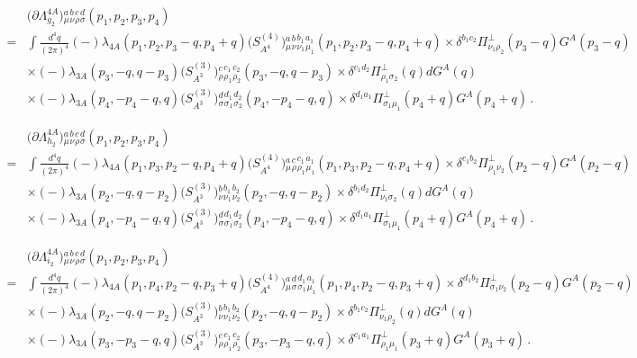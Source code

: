 \begin{align}
  &\big(\partial\Lambda^{4A}_{g_2}\big){}^{a}_{\mu}{}^{b}_{\nu}{}^{c}_{\rho}{}^{d}_{\sigma}(p_1,p_2,p_3,p_4)\nonumber \\[2ex]
 =&\int \frac{d^4 q}{(2\pi)^4} (-)\lambda_{4A}(p_1,p_2,p_3-q,p_4+q)\big(S^{(4)}_{A^4}\big){}^{a}_{\mu}{}^{b}_{\nu}{}^{b_1}_{\nu_1}{}^{a_1}_{\mu_1}(p_1,p_2,p_3-q,p_4+q)\times\delta^{b_1c_2}\Pi_{\nu_1\rho_2}^{\perp}(p_3-q)G^A(p_3-q)\nonumber \\[2ex]
 &\times(-)\lambda_{3A}(p_3,-q,q-p_3)\big(S^{(3)}_{A^3}\big){}^{c}_{\rho}{}^{c_1}_{\rho_1}{}^{c_2}_{\rho_2}(p_3,-q,q-p_3)\times\delta^{c_1d_2}\Pi_{\rho_1\sigma_2}^{\perp}(q)dG^A(q)\nonumber \\[2ex]
 &\times(-)\lambda_{3A}(p_4,-p_4-q,q)\big(S^{(3)}_{A^3}\big){}^{d}_{\sigma}{}^{d_1}_{\sigma_1}{}^{d_2}_{\sigma_2}(p_4,-p_4-q,q)\times\delta^{d_1a_1}\Pi_{\sigma_1\mu_1}^{\perp}(p_4+q)G^A(p_4+q)\,.
\end{align}

\begin{align}
  &\big(\partial\Lambda^{4A}_{h_2}\big){}^{a}_{\mu}{}^{b}_{\nu}{}^{c}_{\rho}{}^{d}_{\sigma}(p_1,p_2,p_3,p_4)\nonumber \\[2ex]
 =&\int \frac{d^4 q}{(2\pi)^4} (-)\lambda_{4A}(p_1,p_3,p_2-q,p_4+q)\big(S^{(4)}_{A^4}\big){}^{a}_{\mu}{}^{c}_{\rho}{}^{c_1}_{\rho_1}{}^{a_1}_{\mu_1}(p_1,p_3,p_2-q,p_4+q)\times\delta^{c_1b_2}\Pi_{\rho_1\nu_2}^{\perp}(p_2-q)G^A(p_2-q)\nonumber \\[2ex]
 &\times(-)\lambda_{3A}(p_2,-q,q-p_2)\big(S^{(3)}_{A^3}\big){}^{b}_{\nu}{}^{b_1}_{\nu_1}{}^{b_2}_{\nu_2}(p_2,-q,q-p_2)\times\delta^{b_1d_2}\Pi_{\nu_1\sigma_2}^{\perp}(q)dG^A(q)\nonumber \\[2ex]
 &\times(-)\lambda_{3A}(p_4,-p_4-q,q)\big(S^{(3)}_{A^3}\big){}^{d}_{\sigma}{}^{d_1}_{\sigma_1}{}^{d_2}_{\sigma_2}(p_4,-p_4-q,q)\times\delta^{d_1a_1}\Pi_{\sigma_1\mu_1}^{\perp}(p_4+q)G^A(p_4+q)\,.
\end{align}

\begin{align}
  &\big(\partial\Lambda^{4A}_{i_2}\big){}^{a}_{\mu}{}^{b}_{\nu}{}^{c}_{\rho}{}^{d}_{\sigma}(p_1,p_2,p_3,p_4)\nonumber \\[2ex]
 =&\int \frac{d^4 q}{(2\pi)^4} (-)\lambda_{4A}(p_1,p_4,p_2-q,p_3+q)\big(S^{(4)}_{A^4}\big){}^{a}_{\mu}{}^{d}_{\sigma}{}^{d_1}_{\sigma_1}{}^{a_1}_{\mu_1}(p_1,p_4,p_2-q,p_3+q)\times\delta^{d_1b_2}\Pi_{\sigma_1\nu_2}^{\perp}(p_2-q)G^A(p_2-q)\nonumber \\[2ex]
 &\times(-)\lambda_{3A}(p_2,-q,q-p_2)\big(S^{(3)}_{A^3}\big){}^{b}_{\nu}{}^{b_1}_{\nu_1}{}^{b_2}_{\nu_2}(p_2,-q,q-p_2)\times\delta^{b_1c_2}\Pi_{\nu_1\rho_2}^{\perp}(q)dG^A(q)\nonumber \\[2ex]
 &\times(-)\lambda_{3A}(p_3,-p_3-q,q)\big(S^{(3)}_{A^3}\big){}^{c}_{\rho}{}^{c_1}_{\rho_1}{}^{c_2}_{\rho_2}(p_3,-p_3-q,q)\times\delta^{c_1a_1}\Pi_{\rho_1\mu_1}^{\perp}(p_3+q)G^A(p_3+q)\,.
\end{align}


